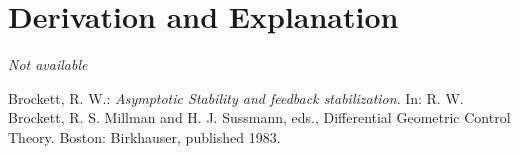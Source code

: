 \documentclass[10pt,a4paper]{article}
\begin{document}
	
	\section{Derivation and Explanation} %
	
	\textit{Not available}
	
	
	\begin{thebibliography}{10}		
		Brockett, R. W.: 
		\textit{Asymptotic Stability and feedback stabilization}. In: R. W. Brockett, R. S. Millman and H. J. Sussmann, eds., Differential Geometric Control Theory. Boston: Birkhauser, published 1983.
	\end{thebibliography}
\end{document}
